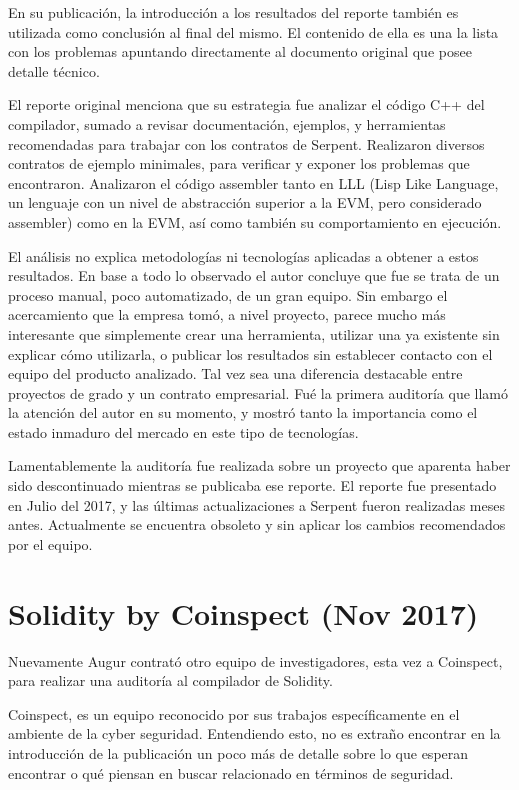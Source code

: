 En su publicación\cite{SerpentCompilerAuditZep}, la introducción a los resultados del reporte también es utilizada como conclusión al final del mismo. El contenido de ella es una la lista con los problemas apuntando directamente al documento original que posee detalle técnico.

El reporte original menciona que su estrategia fue analizar el código C++ del compilador, sumado a revisar documentación, ejemplos, y herramientas recomendadas para trabajar con los contratos de Serpent. Realizaron diversos contratos de ejemplo minimales, para verificar y exponer los problemas que encontraron. Analizaron el código assembler tanto en LLL (Lisp Like Language, un lenguaje con un nivel de abstracción superior a la EVM, pero considerado assembler) como en la EVM, así como también su comportamiento en ejecución.

El análisis no explica metodologías ni tecnologías aplicadas a obtener a estos resultados. En base a todo lo observado el autor concluye que fue se trata de un proceso manual, poco automatizado, de un gran equipo. Sin embargo el acercamiento que la empresa tomó, a nivel proyecto, parece mucho más interesante que simplemente crear una herramienta, utilizar una ya existente sin explicar cómo utilizarla, o publicar los resultados sin establecer contacto con el equipo del producto analizado. Tal vez sea una diferencia destacable entre proyectos de grado y un contrato empresarial.
Fué la primera auditoría que llamó la atención del autor en su momento, y mostró tanto la importancia como el estado inmaduro del mercado en este tipo de tecnologías. 

Lamentablemente la auditoría fue realizada sobre un proyecto que aparenta haber sido descontinuado mientras se publicaba ese reporte. El reporte fue presentado en Julio del 2017, y las últimas actualizaciones a Serpent fueron realizadas meses antes. Actualmente se encuentra obsoleto y sin aplicar los cambios recomendados por el equipo.


\section{Solidity by Coinspect (Nov 2017)}
Nuevamente Augur contrató otro equipo de investigadores, esta vez a Coinspect, para realizar una auditoría al compilador de Solidity.

Coinspect, es un equipo reconocido por sus trabajos específicamente en el ambiente de la cyber seguridad. Entendiendo esto, no es extraño encontrar en la introducción de la publicación\cite{SolidityCompilerAuditReport} un poco más de detalle\cite{SummaryCoinspectReport} sobre lo que esperan encontrar o qué piensan en buscar relacionado en términos de seguridad.

